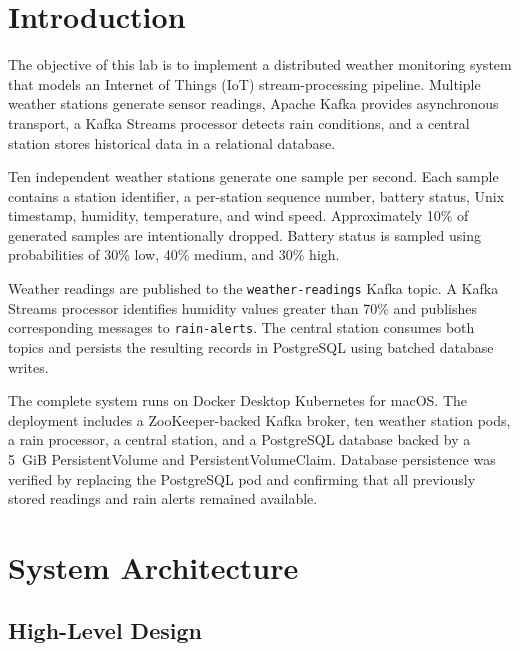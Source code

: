 \documentclass[12pt,a4paper]{article}
\begin{document}
\tableofcontents
\newpage
\listoffigures
\newpage

\section{Introduction}
The objective of this lab is to implement a distributed weather monitoring system that models an Internet of Things (IoT) stream-processing pipeline. Multiple weather stations generate sensor readings, Apache Kafka provides asynchronous transport, a Kafka Streams processor detects rain conditions, and a central station stores historical data in a relational database.

Ten independent weather stations generate one sample per second. Each sample contains a station identifier, a per-station sequence number, battery status, Unix timestamp, humidity, temperature, and wind speed. Approximately 10\% of generated samples are intentionally dropped. Battery status is sampled using probabilities of 30\% low, 40\% medium, and 30\% high.

Weather readings are published to the \texttt{weather-readings} Kafka topic. A Kafka Streams processor identifies humidity values greater than 70\% and publishes corresponding messages to \texttt{rain-alerts}. The central station consumes both topics and persists the resulting records in PostgreSQL using batched database writes.

The complete system runs on Docker Desktop Kubernetes for macOS. The deployment includes a ZooKeeper-backed Kafka broker, ten weather station pods, a rain processor, a central station, and a PostgreSQL database backed by a 5~GiB PersistentVolume and PersistentVolumeClaim. Database persistence was verified by replacing the PostgreSQL pod and confirming that all previously stored readings and rain alerts remained available.

\section{System Architecture}
\subsection{High-Level Design}
\end{document}

